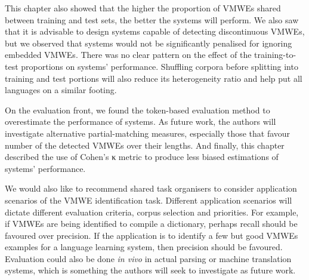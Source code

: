 \documentclass[output=paper,modfonts,nonflat,draftmode]{langsci/langscibook}
\begin{document}
This chapter also showed that the higher the proportion of VMWEs shared between training and test sets, the better the systems will perform. 
We also saw that it is advisable to design systems capable of detecting discontinuous VMWEs, but we observed that systems would not be significantly penalised for ignoring embedded VMWEs. There was no clear pattern on the effect of the training-to-test proportions on systems' performance. 
Shuffling corpora before splitting into training and test portions will also reduce its heterogeneity
 ratio and help put all languages on a similar footing. 

On the evaluation front, we found the token-based evaluation method to overestimate the performance of systems. As future work, the authors will investigate alternative partial-matching measures, especially those that favour number of the detected VMWEs over their lengths. And finally, this chapter described the use of Cohen's κ metric to produce less biased estimations of systems' performance.




We would also like to recommend shared task organisers to consider application scenarios of the VMWE identification task. Different application scenarios will dictate different evaluation criteria, corpus selection and priorities. For example, if VMWEs are being identified to compile a dictionary, perhaps recall should be favoured over precision. If the application is to identify a few but good VMWEs examples for a language learning system, then precision should be favoured. Evaluation could also be done \emph{in vivo} in actual parsing or machine translation systems, which is something the authors will seek to investigate as future work.
\end{document}

